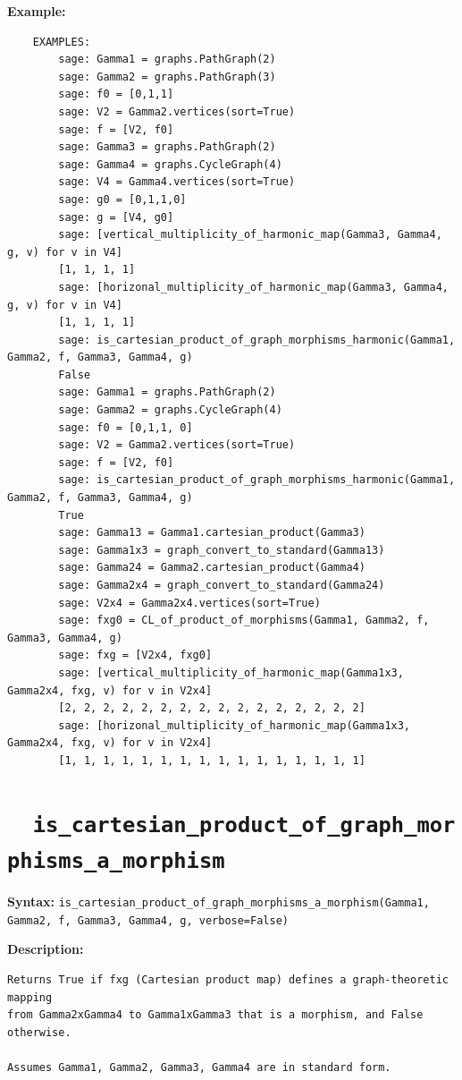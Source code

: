 \documentclass{article}
\begin{document}
\textbf{Example:}
\begin{verbatim}
    EXAMPLES:
        sage: Gamma1 = graphs.PathGraph(2)
        sage: Gamma2 = graphs.PathGraph(3)
        sage: f0 = [0,1,1]       
        sage: V2 = Gamma2.vertices(sort=True) 
        sage: f = [V2, f0]     
        sage: Gamma3 = graphs.PathGraph(2) 
        sage: Gamma4 = graphs.CycleGraph(4) 
        sage: V4 = Gamma4.vertices(sort=True) 
        sage: g0 = [0,1,1,0]     
        sage: g = [V4, g0]  
        sage: [vertical_multiplicity_of_harmonic_map(Gamma3, Gamma4, g, v) for v in V4]  
        [1, 1, 1, 1]
        sage: [horizonal_multiplicity_of_harmonic_map(Gamma3, Gamma4, g, v) for v in V4] 
        [1, 1, 1, 1]
        sage: is_cartesian_product_of_graph_morphisms_harmonic(Gamma1, Gamma2, f, Gamma3, Gamma4, g) 
        False
        sage: Gamma1 = graphs.PathGraph(2) 
        sage: Gamma2 = graphs.CycleGraph(4) 
        sage: f0 = [0,1,1, 0]    
        sage: V2 = Gamma2.vertices(sort=True)    
        sage: f = [V2, f0]                         
        sage: is_cartesian_product_of_graph_morphisms_harmonic(Gamma1, Gamma2, f, Gamma3, Gamma4, g)  
        True
        sage: Gamma13 = Gamma1.cartesian_product(Gamma3) 
        sage: Gamma1x3 = graph_convert_to_standard(Gamma13)
        sage: Gamma24 = Gamma2.cartesian_product(Gamma4)   
        sage: Gamma2x4 = graph_convert_to_standard(Gamma24) 
        sage: V2x4 = Gamma2x4.vertices(sort=True)
        sage: fxg0 = CL_of_product_of_morphisms(Gamma1, Gamma2, f, Gamma3, Gamma4, g) 
        sage: fxg = [V2x4, fxg0]  
        sage: [vertical_multiplicity_of_harmonic_map(Gamma1x3, Gamma2x4, fxg, v) for v in V2x4]  
        [2, 2, 2, 2, 2, 2, 2, 2, 2, 2, 2, 2, 2, 2, 2, 2]
        sage: [horizonal_multiplicity_of_harmonic_map(Gamma1x3, Gamma2x4, fxg, v) for v in V2x4] 
        [1, 1, 1, 1, 1, 1, 1, 1, 1, 1, 1, 1, 1, 1, 1, 1]
\end{verbatim}

\section{\tt \ \ is\_cartesian\_product\_of\_graph\_morphisms\_a\_morphism}

\textbf{Syntax:}
{\small{
\verb}is_cartesian_product_of_graph_morphisms_a_morphism(Gamma1, Gamma2, f, Gamma3, Gamma4, g, verbose=False)}\\
}}

\textbf{Description:}
\begin{verbatim}
Returns True if fxg (Cartesian product map) defines a graph-theoretic mapping
from Gamma2xGamma4 to Gamma1xGamma3 that is a morphism, and False otherwise. 

Assumes Gamma1, Gamma2, Gamma3, Gamma4 are in standard form.
\end{verbatim}
\end{document}
